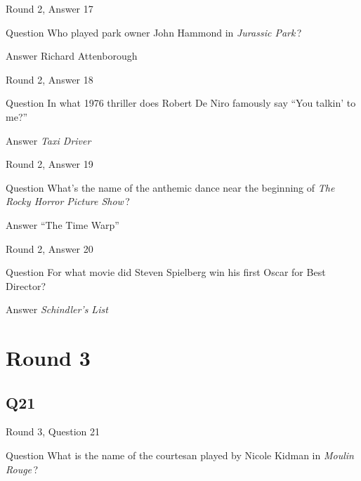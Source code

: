 \documentclass[11pt]{beamer}
\begin{document}
\begin{frame}[t]{Round 2, Answer 17}
\vspace{2em}
\begin{block}{Question}
Who played park owner John Hammond in \emph{Jurassic Park}\,?
\end{block}
\pause{}
\begin{block}{Answer}
Richard Attenborough
\end{block}
\end{frame}
    

\begin{frame}[t]{Round 2, Answer 18}
\vspace{2em}
\begin{block}{Question}
In what 1976 thriller does Robert De Niro famously say ``You talkin' to me?''
\end{block}
\pause{}
\begin{block}{Answer}
\emph{Taxi Driver}
\end{block}
\end{frame}
    

\begin{frame}[t]{Round 2, Answer 19}
\vspace{2em}
\begin{block}{Question}
What's the name of the anthemic dance near the beginning of \emph{The Rocky Horror Picture Show}\,?
\end{block}
\pause{}
\begin{block}{Answer}
``The Time Warp''
\end{block}
\end{frame}
    

\begin{frame}[t]{Round 2, Answer 20}
\vspace{2em}
\begin{block}{Question}
For what movie did Steven Spielberg win his first Oscar for Best Director?
\end{block}
\pause{}
\begin{block}{Answer}
\emph{Schindler's List}
\end{block}
\end{frame}
    

\section{Round 3}
    

\subsection*{Q21}
\begin{frame}[t]{Round 3, Question 21}
\vspace{2em}
\begin{block}{Question}
What is the name of the courtesan played by Nicole Kidman in \emph{Moulin Rouge}\,?
\end{block}
\end{frame}
    
\end{document}
